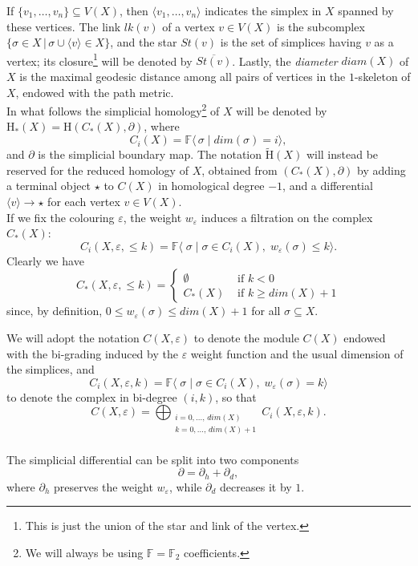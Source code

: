 \documentclass[11pt, a4paper, reqno, twoside, makeidx]{amsart}
\theoremstyle{remark}
\theoremstyle{plain}
\theoremstyle{definition}
\newcommand{\F}{\mathbb{F}}
\newcommand{\HH}{\mathrm{H}}
\begin{document}
If $\{ v_1, \ldots,v_n\} \subseteq V(X)$, then $\langle v_1, \ldots,v_n\rangle$ indicates the simplex in $X$ spanned by these vertices.
The link $lk(v)$ of a vertex $v \in V(X)$ is the subcomplex $\{\sigma \in X\,|\, \sigma \cup \langle v\rangle \in X \}$, and the star $St(v)$ is the set of simplices having $v$ as a vertex; its closure\footnote{This is just the union of the star and link of the vertex.} will be denoted by $\overline{St(v)}$. Lastly, the \emph{diameter} $diam(X)$ of $X$ is the maximal geodesic distance among all pairs of vertices in the $1$-skeleton of $X$, endowed with the path metric.
~\\

In what follows the simplicial homology\footnote{We will always be using $\F = \F_2$ coefficients.} of $X$ will be denoted by $\HH_*(X) = \HH (C_*(X), \partial)$, where $$C_i(X) = \F\langle\,\sigma \;|\; dim(\sigma) = i\rangle,$$ and $\partial$ is the simplicial boundary map.  The notation $\widetilde{\HH}(X)$ will instead be reserved for the reduced homology of $X$, obtained from $(C_*(X), \partial)$ by adding a terminal object $\star$ to $C(X)$ in homological degree $-1$, and a differential $\langle v\rangle \longrightarrow \star$ for each vertex $v \in V(X)$.\\ 

If we fix the colouring $\varepsilon$, the weight $w_\varepsilon$ induces a filtration on the complex $C_*(X)$:
$$C_i(X,\varepsilon, \le k) = \F\langle\; \sigma\;|\; \sigma \in C_i(X),\;  w_\varepsilon(\sigma) \le k\rangle.$$ 
Clearly we have 
\begin{equation}
C_*(X,\varepsilon, \le k) = \begin{cases}
\emptyset &  \text{ if } k < 0\\
C_*(X) & \text{ if } k \ge dim(X) +1
\end{cases}
\end{equation}
since, by definition, $0 \le w_\varepsilon(\sigma) \le dim(X) +1$ for all $\sigma \subseteq X$.

We will adopt the notation $C(X, \varepsilon)$ to denote the module $C(X)$ endowed with the bi-grading induced by the $\varepsilon$ weight function and the usual dimension of the simplices, and $$C_i(X, \varepsilon,k) = \F \langle \; \sigma\;|\; \sigma \in C_i(X),\;  w_\varepsilon(\sigma) = k\rangle$$ to denote the  complex in bi-degree $(i,k)$, so that $$C(X, \varepsilon) = \bigoplus_{\substack {i = 0, \ldots,\, dim(X) \\ k = 0, \ldots,\, dim(X)+1}} C_i(X, \varepsilon,k).$$ 
~\\
The simplicial differential can be split into two components
$$\partial = \partial_h + \partial_d,$$
where $\partial_h$ preserves the weight $w_\varepsilon$, while $\partial_d$ decreases it by $1$. 
\end{document}
